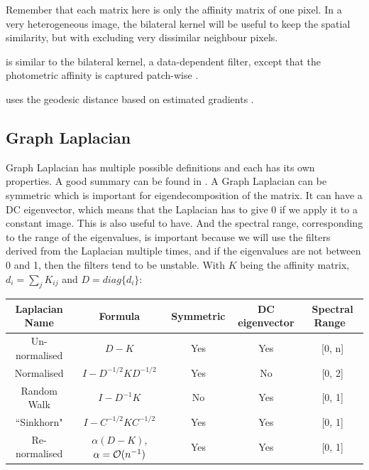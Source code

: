 \begin{description}[align=left]
  Remember that each matrix here is only the affinity matrix of one pixel.
  In a very heterogeneous image, the bilateral kernel will be useful to keep the spatial similarity, but with excluding very dissimilar neighbour pixels.

 \item [Non-Local Means (NLM)] is similar to the bilateral kernel, a data-dependent filter, except that the photometric affinity is captured patch-wise \cite{glide_2014}.
 \item [Locally Adaptive Regression Kernel (LARK)] uses the geodesic distance based on estimated gradients \cite{milanfar_symmetrizing_2013} \cite{takeda_kernel_2007}.
\end{description}

\subsection{Graph Laplacian}
\label{subsec:laplacian-variations}
Graph Laplacian has multiple possible definitions and each has its own properties.
A good summary can be found in \cite{siam_slides_2016}.
A Graph Laplacian can be symmetric which is important for eigendecomposition of the matrix.
It can have a DC eigenvector, which means that the Laplacian has to give 0 if we apply it to a constant image. This is also useful to have.
And the spectral range, corresponding to the range of the eigenvalues, is important because we will use the filters derived from the Laplacian multiple times, and if the eigenvalues are not between 0 and 1, then the filters tend to be unstable.
With \(K\) being the affinity matrix, \(d_i = \sum_j K_{ij}\) and \(D = diag\{d_i\}\): %

\begin{table}[!htbp]
 \centering
 \begin{tabular}{|c|c|c|c|c|}
  \hline
  Laplacian Name & Formula & Symmetric & DC eigenvector & Spectral Range \\
  \hline
  Un-normalised & \(D - K\) & Yes & Yes & [0, n] \\
  \hline
  Normalised & \(I - D^{-1/2}KD^{-1/2}\) & Yes & No & [0, 2] \\
  \hline
  Random Walk & \(I - D^{-1}K\) & No & Yes & [0, 1] \\
  \hline
  ``Sinkhorn" \cite{milanfar_symmetrizing_2013} & \(I - C^{-1/2}KC^{-1/2}\) & Yes & Yes & [0, 1] \\
  \hline
  Re-normalised & \(\alpha(D - K)\), \(\alpha = \operatorname{\mathcal{O}}(n^{-1})\) & Yes & Yes & [0, 1] \\
  \hline
 \end{tabular}
\end{table}


